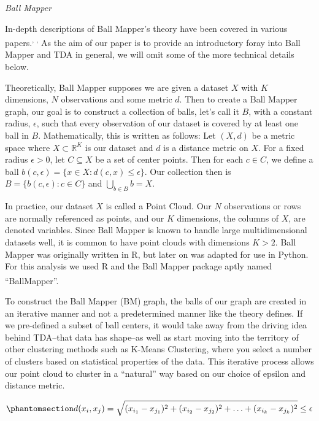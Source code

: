 \documentclass[10pt, letterpaper]{article}
\begin{document}
\emph{Ball Mapper}

In-depth descriptions of Ball Mapper's theory have been covered in
various
papers.\textsuperscript{,
,
} As the aim of our paper is
to provide an introductory foray into Ball Mapper and TDA in general, we
will omit some of the more technical details below.

Theoretically, Ball Mapper supposes we are given a dataset \(X\) with
\(K\) dimensions, \(N\) observations and some metric \(d\). Then to
create a Ball Mapper graph, our goal is to construct a collection of
balls, let's call it \(B\), with a constant radius, \(\epsilon\), such
that every observation of our dataset is covered by at least one ball in
\(B\). Mathematically, this is written as follows: Let \((X, d)\) be a
metric space where \(X \subset \mathbb{R}^K\) is our dataset and \(d\)
is a distance metric on \(X\). For a fixed radius \(\epsilon >0\), let
\(C \subseteq X\) be a set of center points. Then for each \(c \in C\),
we define a ball
\(b(c, \epsilon) = \{x \in X : d(c, x) \leq \epsilon\}\). Our collection
then is \(B = \{b(c, \epsilon) : c \in C\}\) and
\(\bigcup_{b \in B} b = X\).

In practice, our dataset \(X\) is called a Point Cloud. Our \(N\)
observations or rows are normally referenced as points, and our \(K\)
dimensions, the columns of \(X\), are denoted variables. Since Ball
Mapper is known to handle large multidimensional datasets well, it is
common to have point clouds with dimensions \(K > 2\). Ball Mapper was
originally written in R, but later on was adapted for use in Python. For
this analysis we used R and the Ball Mapper package aptly named
``BallMapper''.\textsuperscript{}

To construct the Ball Mapper (BM) graph, the balls of our graph are
created in an iterative manner and not a predetermined manner like the
theory defines. If we pre-defined a subset of ball centers, it would
take away from the driving idea behind TDA--that data has shape--as well
as start moving into the territory of other clustering methods such as
K-Means Clustering, where you select a number of clusters based on
statistical properties of the data. This iterative process allows our
point cloud to cluster in a ``natural'' way based on our choice of
epsilon and distance metric.

\begin{equation}\phantomsection\label{eq-euclideanDistance}{
d(x_i, x_j) = 
\sqrt{(x_{i_1} - x_{j_1})^2 + (x_{i_2} - x_{j_2})^2 + \ldots + (x_{i_k} - x_{j_k})^2} \leq \epsilon
}\end{equation}
\end{document}
